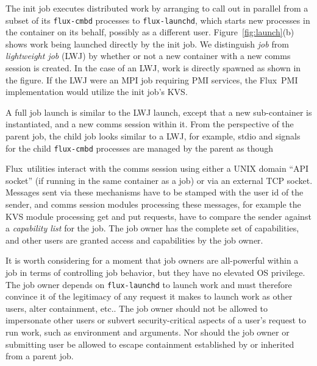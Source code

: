 \documentclass[10pt]{article}
\newcommand{\flux}{Flux}
\begin{document}
The init job executes distributed work
by arranging to call out in parallel from a subset of its
{\tt flux-cmbd} processes to {\tt flux-launchd}, which starts
new processes in the container on its behalf, possibly as a different user.
Figure~\ref{fig:launch}(b) shows work being launched directly by the
init job.  We distinguish {\em job} from {\em lightweight job} (LWJ)
by whether or not a new container with a new comms session is created.
In the case of an LWJ, work is directly spawned as shown in the figure.
If the LWJ were an MPI job requiring PMI services, the \flux\ PMI
implementation would utilize the init job's KVS.

A full job launch is similar to the LWJ launch, except that a new
sub-container is instantiated, and a new comms session within it.
From the perspective of the parent job, the child job looks similar to
a LWJ, for example, stdio and signals for the child {\tt flux-cmbd} processes
are managed by the parent as though 




\flux\ utilities interact with the comms session using either a UNIX
domain ``API socket'' (if running in the same container as a job)
or via an external TCP socket.  Messages sent via these mechanisms
have to be stamped with the user id of the sender, and comms session
modules processing these messages, for example the KVS module processing
get and put requests, have to compare the sender against a
{\em capability list} for the job.  The job owner has the complete
set of capabilities, and other users are granted access and capabilities
by the job owner.

It is worth considering for a moment that job owners are all-powerful within
a job in terms of controlling job behavior, but they have no elevated OS
privilege.  The job owner depends on {\tt flux-launchd} to launch work
and must therefore convince it of the legitimacy of any
request it makes to launch work as other users, alter containment, etc..
The job owner should not be allowed to impersonate other users or
subvert security-critical aspects of a user's request to run work,
such as environment and arguments.  Nor should the job owner or submitting
user be allowed to escape containment established by or inherited from
a parent job.  
\end{document}
